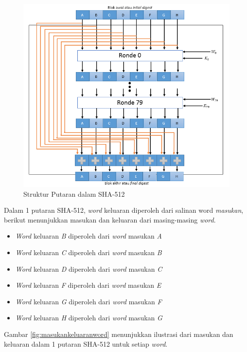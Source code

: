 \begin{figure}[H]
	\includegraphics[scale=0.7]{Gambar/compression_function}
	\centering
	\caption{Struktur Putaran dalam SHA-512}\label{fig:strukturputaran}
\end{figure}

Dalam 1 putaran SHA-512, \textit{word} keluaran diperoleh dari salinan word \textit{masukan}, berikut menunjukkan masukan dan keluaran dari masing-masing \textit{word}.

\begin{itemize}
	\item \textit{Word} keluaran \textit{B} diperoleh dari \textit{word} masukan \textit{A}
	\item \textit{Word} keluaran \textit{C} diperoleh dari \textit{word} masukan \textit{B}
	\item \textit{Word} keluaran \textit{D} diperoleh dari \textit{word} masukan \textit{C}
	\item \textit{Word} keluaran \textit{F} diperoleh dari \textit{word} masukan \textit{E}
	\item \textit{Word} keluaran \textit{G} diperoleh dari \textit{word} masukan \textit{F}
	\item \textit{Word} keluaran \textit{H} diperoleh dari \textit{word} masukan \textit{G}
\end{itemize}

Gambar \ref{fig:masukankeluaranword} menunjukkan ilustrasi dari masukan dan keluaran dalam 1 putaran SHA-512 untuk setiap \textit{word}.


